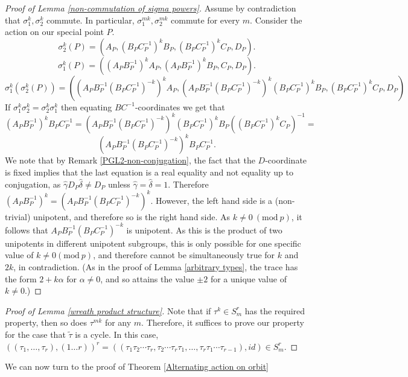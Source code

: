 \documentclass[letterpaper]{amsart}
\begin{document}
\begin{proof}[Proof of Lemma \ref{non-commutation of sigma powers}]
    Assume by contradiction that $\sigma_1^k,\sigma_2^k$ commute. In particular, $\sigma_1^{mk},\sigma_2^{mk}$ commute for every $m$. Consider the action on our special point $P$.
    $$\sigma_2^k(P) = (A_P, (B_PC_P^{-1})^kB_P, (B_PC_P^{-1})^kC_P, D_P).$$
    $$\sigma_1^k(P) = ((A_PB_P^{-1})^kA_P, (A_PB_P^{-1})^kB_P, C_P, D_P).$$
    $$\sigma_1^k(\sigma_2^k(P))=((A_PB_P^{-1}(B_PC_P^{-1})^{-k})^kA_P, (A_PB_P^{-1}(B_PC_P^{-1})^{-k})^k(B_PC_P^{-1})^kB_P, (B_PC_P^{-1})^kC_P, D_P)$$
    If $\sigma_1^k\sigma_2^k=\sigma_2^k\sigma_1^k$ then equating $BC^{-1}$-coordinates we get that
    $$(A_PB_P^{-1})^kB_PC_P^{-1} = (A_PB_P^{-1}(B_PC_P^{-1})^{-k})^k(B_PC_P^{-1})^kB_P ((B_PC_P^{-1})^kC_P)^{-1} =$$
    $$(A_PB_P^{-1}(B_PC_P^{-1})^{-k})^k B_PC_P^{-1}.$$
    We note that by Remark \ref{PGL2-non-conjugation}, the fact that the $D$-coordinate is fixed implies that the last equation is a real equality and not equality up to conjugation, as $\hat{\gamma}D_P\hat{\delta} \neq D_P$ unless $\hat{\gamma} = \hat{\delta} = 1.$
    Therefore $(A_PB_P^{-1})^k = (A_PB_P^{-1}(B_PC_P^{-1})^{-k})^k$. However, the left hand side is a (non-trivial) unipotent, and therefore so is the right hand side. As $k \neq 0\ (\mathrm{mod}\ p)$, it follows that $A_PB_P^{-1}(B_PC_P^{-1})^{-k}$ is unipotent. As this is the product of two unipotents in different unipotent subgroups, this is only possible for one specific value of $k \neq 0 (\mathrm{mod}\ p)$, and therefore cannot be simultaneously true for $k$ and $2k$, in contradiction. (As in the proof of Lemma \ref{arbitrary types}, the trace has the form $2 + k\alpha$ for $\alpha \neq 0$, and so attains the value $\pm 2$ for a unique value of $k \neq 0.$)
\end{proof}
\begin{proof}[Proof of Lemma \ref{wreath product structure}]
Note that if $\tau^k \in S_m^r$ has the required property, then so does $\tau^{mk}$ for any $m$. Therefore, it suffices to prove our property for the case that $\tilde{\tau}$ is a cycle. In this case, $((\tau_1, \dots, \tau_r),(1 \dots r))^r = ((\tau_1 \tau_2 \cdots \tau_r, \tau_2 \cdots \tau_r \tau_1, \dots, \tau_r\tau_1 \cdots \tau_{r - 1}), id) \in S_m^r$.
\end{proof}
We can now turn to the proof of Theorem \ref{Alternating action on orbit}
\end{document}
